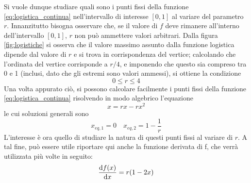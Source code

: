 Si vuole dunque studiare quali sono i punti fissi della funzione \ref{eq:logistica_continua} nell'intervallo di interesse $[0,1]$ al variare del parametro $r$. Innanzitutto bisogna osservare che, se il valore di $f$ deve rimanere all'interno dell'intervallo $[0,1]$, $r$ non può ammettere valori arbitrari. Dalla figura \ref{fig:logistiche} si osserva che il valore massimo assunto dalla funzione logistica dipende dal valore di $r$ e si trova in corrispondenza del vertice; calcolando che l'ordinata del vertice corrisponde a $r/4$, e imponendo che questo sia compreso tra 0 e 1 (inclusi, dato che gli estremi sono valori ammessi), si ottiene la condizione 
\[
    \boxed{0 \leq r \leq 4}
\]
Una volta appurato ciò, si possono calcolare facilmente i punti fissi della funzione \ref{eq:logistica_continua} risolvendo in modo algebrico l'equazione $$ x = rx - rx^2$$ le cui soluzioni generali sono 
\[
    \boxed{x_{eq,1} = 0} \quad \boxed{x_{eq,2} = 1 - \dfrac{1}{r}}
\]
L'interesse è ora quello di studiare la natura di questi punti fissi al variare di $r$. A tal fine, può essere utile riportare qui anche la funzione derivata di f, che verrà utilizzata più volte in seguito:
\begin{equation}
    \dfrac{\dif f(x)}{\dif x} = r (1-2x)
    \label{eq:derivata}
\end{equation}

